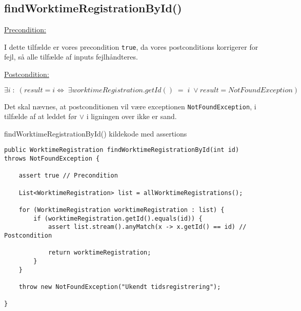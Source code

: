 \subsection{findWorktimeRegistrationById()} \label{sec:contract_findd_work}
\noindent \underline{Precondition:}
\vspace{4pt}

I dette tilfælde er vores precondition \texttt{true}, da vores postconditions korrigerer for fejl, så alle tilfælde af inputs fejlhåndteres.
\vspace{4pt}

\noindent
\underline{Postcondition:}
\vspace{4pt}

\begin{equation}
  \exists i\; :\; (result = i \iff\; \exists worktimeRegistration.getId() \; = \; i\; \lor result = NotFoundException)
\end{equation}\label{postcondition 1}
\vspace{4pt}

Det skal nævnes, at postconditionen vil være exceptionen \texttt{NotFoundException}, i tilfælde af at leddet før \(\lor\) i ligningen over ikke er sand.
\begin{listing}[H]
  \centering
  \caption{findWorktimeRegistrationById() kildekode med assertions}\label{lst:find_work_time_registration_by_id_assertions}
  \begin{verbatim}
public WorktimeRegistration findWorktimeRegistrationById(int id) throws NotFoundException {

    assert true // Precondition
    
    List<WorktimeRegistration> list = allWorktimeRegistrations();

    for (WorktimeRegistration worktimeRegistration : list) {
        if (worktimeRegistration.getId().equals(id)) {
            assert list.stream().anyMatch(x -> x.getId() == id) // Postcondition
            
            return worktimeRegistration;
        }
    }

    throw new NotFoundException("Ukendt tidsregistrering");

}
    \end{verbatim}
\end{listing}